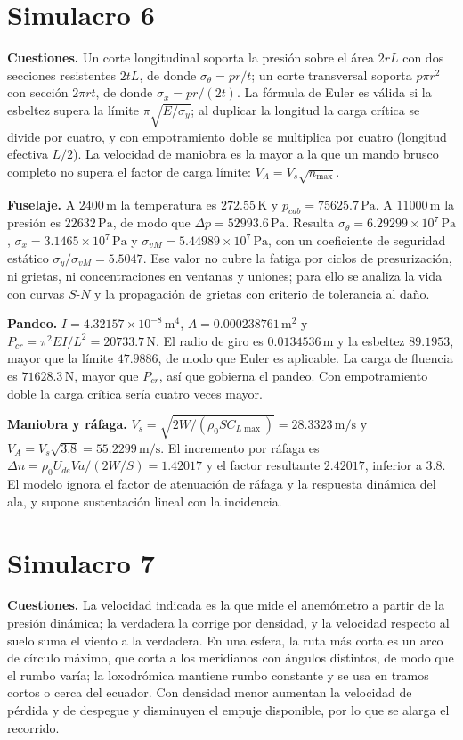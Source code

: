 

\section{Simulacro 6}
\textbf{Cuestiones.} Un corte longitudinal soporta la presión sobre el área $2rL$ con dos secciones resistentes $2tL$, de donde $\sigma_\theta=pr/t$; un corte transversal soporta $p\pi r^2$ con sección $2\pi rt$, de donde $\sigma_x=pr/(2t)$. La fórmula de Euler es válida si la esbeltez supera la límite $\pi\sqrt{E/\sigma_y}$; al duplicar la longitud la carga crítica se divide por cuatro, y con empotramiento doble se multiplica por cuatro (longitud efectiva $L/2$). La velocidad de maniobra es la mayor a la que un mando brusco completo no supera el factor de carga límite: $V_A=V_s\sqrt{n_{\max}}$.

\textbf{Fuselaje.} A $2400\,\mathrm m$ la temperatura es $272.55\,\mathrm K$ y $p_{cab}=75625.7\,\mathrm{Pa}$. A $11000\,\mathrm m$ la presión es $22632\,\mathrm{Pa}$, de modo que $\Delta p=52993.6\,\mathrm{Pa}$. Resulta $\sigma_\theta=6.29299\times10^{7}\,\mathrm{Pa}$, $\sigma_x=3.1465\times10^{7}\,\mathrm{Pa}$ y $\sigma_{vM}=5.44989\times10^{7}\,\mathrm{Pa}$, con un coeficiente de seguridad estático $\sigma_y/\sigma_{vM}=5.5047$. Ese valor no cubre la fatiga por ciclos de presurización, ni grietas, ni concentraciones en ventanas y uniones; para ello se analiza la vida con curvas $S$-$N$ y la propagación de grietas con criterio de tolerancia al daño.

\textbf{Pandeo.} $I=4.32157\times10^{-8}\,\mathrm{m^4}$, $A=0.000238761\,\mathrm{m^2}$ y $P_{cr}=\pi^2EI/L^2=20733.7\,\mathrm N$. El radio de giro es $0.0134536\,\mathrm m$ y la esbeltez $89.1953$, mayor que la límite $47.9886$, de modo que Euler es aplicable. La carga de fluencia es $71628.3\,\mathrm N$, mayor que $P_{cr}$, así que gobierna el pandeo. Con empotramiento doble la carga crítica sería cuatro veces mayor.

\textbf{Maniobra y ráfaga.} $V_s=\sqrt{2W/(\rho_0SC_{L\max})}=28.3323\,\mathrm{m/s}$ y $V_A=V_s\sqrt{3.8}=55.2299\,\mathrm{m/s}$. El incremento por ráfaga es $\Delta n=\rho_0U_{de}Va/(2W/S)=1.42017$ y el factor resultante $2.42017$, inferior a $3.8$. El modelo ignora el factor de atenuación de ráfaga y la respuesta dinámica del ala, y supone sustentación lineal con la incidencia.



\section{Simulacro 7}
\textbf{Cuestiones.} La velocidad indicada es la que mide el anemómetro a partir de la presión dinámica; la verdadera la corrige por densidad, y la velocidad respecto al suelo suma el viento a la verdadera. En una esfera, la ruta más corta es un arco de círculo máximo, que corta a los meridianos con ángulos distintos, de modo que el rumbo varía; la loxodrómica mantiene rumbo constante y se usa en tramos cortos o cerca del ecuador. Con densidad menor aumentan la velocidad de pérdida y de despegue y disminuyen el empuje disponible, por lo que se alarga el recorrido.

